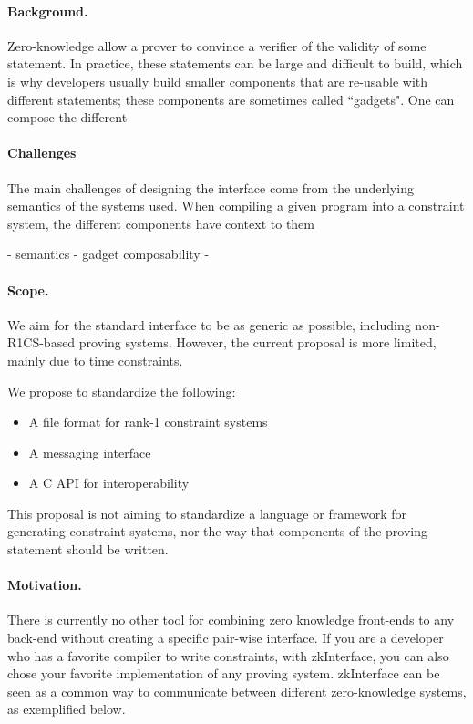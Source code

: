 \documentclass[a4paper,11pt]{article}
\begin{document}
	\paragraph{Background.} Zero-knowledge allow a prover to convince a verifier of the validity of some statement. In practice, these statements can be large and difficult to build, which is why developers usually build smaller components that are re-usable with different statements; these components are sometimes called ``gadgets". One can compose the different 
	
	
	\paragraph{Challenges}
	
	The main challenges of designing the interface come from the underlying semantics of the systems used. When compiling a given program into a constraint system, the different components have context to them
	
	- semantics
	- gadget composability
	- 
	
	\paragraph{Scope.} We aim for the standard interface to be as generic as possible, including non-R1CS-based proving systems. However, the current proposal is more limited, mainly due to time constraints.
	
	We propose to standardize the following:
	\begin{itemize}
		\item A file format for rank-1 constraint systems
		\item A messaging interface 
		\item A C API for interoperability
	\end{itemize}
	
	This proposal is not aiming to standardize a language or framework for generating constraint systems, nor the way that components of the proving statement should be written.  
	
	
	\paragraph{Motivation.} There is currently no other tool for combining zero knowledge front-ends to any back-end without creating a specific pair-wise interface. If you are a developer who has a favorite compiler to write constraints, with zkInterface, you can also chose your favorite implementation of any proving system. zkInterface can be seen as a common way to communicate between different zero-knowledge systems, as exemplified below.
	
\end{document}
